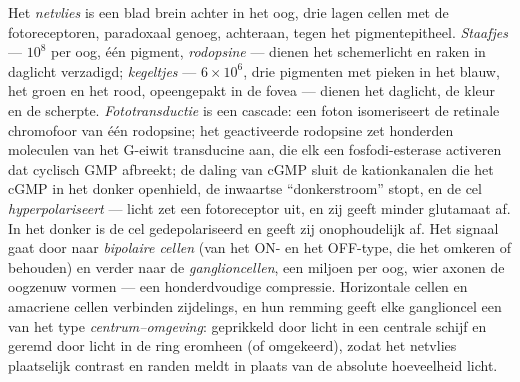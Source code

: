 \begin{definition}\label{def:b3:sensory-systems:retina}
Het \emph{netvlies} is een blad brein achter in het oog, drie lagen
cellen met de fotoreceptoren, paradoxaal genoeg, achteraan, tegen het
pigmentepitheel. \emph{Staafjes} --- $10^{8}$ per oog, één pigment,
\emph{rodopsine} --- dienen het schemerlicht en raken in daglicht
verzadigd; \emph{kegeltjes} --- $6\times 10^{6}$, drie pigmenten met
pieken in het blauw, het groen en het rood, opeengepakt in de fovea ---
dienen het daglicht, de kleur en de scherpte. \emph{Fototransductie} is
een cascade: een foton isomeriseert de retinale chromofoor van één
rodopsine; het geactiveerde rodopsine zet honderden moleculen van het
G-eiwit transducine aan, die elk een fosfodi-esterase activeren dat
cyclisch GMP afbreekt; de daling van cGMP sluit de kationkanalen die
het cGMP in het donker openhield, de inwaartse ``donkerstroom'' stopt,
en de cel \emph{hyperpolariseert} --- licht zet een fotoreceptor uit,
en zij geeft minder glutamaat af. In het donker is de cel
gedepolariseerd en geeft zij onophoudelijk af. Het signaal gaat door
naar \emph{bipolaire cellen} (van het ON- en het OFF-type, die het
omkeren of behouden) en verder naar de \emph{ganglioncellen}, een
miljoen per oog, wier axonen de oogzenuw vormen --- een honderdvoudige
compressie. Horizontale cellen en amacriene cellen verbinden zijdelings,
en hun remming geeft elke ganglioncel een  van het type
\emph{centrum--omgeving}: geprikkeld door licht in een centrale schijf
en geremd door licht in de ring eromheen (of omgekeerd), zodat het
netvlies plaatselijk contrast en randen meldt in plaats van de absolute
hoeveelheid licht.
\end{definition}

